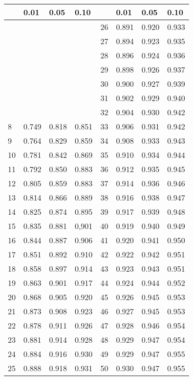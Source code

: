 \newpage \renewcommand\thetable{\arabic{table}}
    \label{tab7}
    \begin{tabularx}{\linewidth}{YYYY||YYYY}
      \toprule
       & 0.01 & 0.05 & 0.10 &
      & 0.01 & 0.05 & 0.10 \\
      \midrule
        & & & & 26 & 0.891 & 0.920 & 0.933 \\
        & & & & 27 & 0.894 & 0.923 & 0.935 \\
        & & & & 28 & 0.896 & 0.924 & 0.936 \\
        & & & & 29 & 0.898 & 0.926 & 0.937 \\
        & & & & 30 & 0.900 & 0.927 & 0.939 \\
        & & & & 31 & 0.902 & 0.929 & 0.940 \\
        & & & & 32 & 0.904 & 0.930 & 0.942 \\
      8 & 0.749 & 0.818 & 0.851 & 33 & 0.906 & 0.931 & 0.942 \\
      9 & 0.764 & 0.829 & 0.859 & 34 & 0.908 & 0.933 & 0.943 \\
      10 & 0.781 & 0.842 & 0.869 & 35 & 0.910 & 0.934 & 0.944 \\
      11 & 0.792 & 0.850 & 0.883 & 36 & 0.912 & 0.935 & 0.945 \\
      12 & 0.805 & 0.859 & 0.883 & 37 & 0.914 & 0.936 & 0.946 \\
      13 & 0.814 & 0.866 & 0.889 & 38 & 0.916 & 0.938 & 0.947 \\
      14 & 0.825 & 0.874 & 0.895 & 39 & 0.917 & 0.939 & 0.948 \\
      15 & 0.835 & 0.881 & 0,901 & 40 & 0.919 & 0.940 & 0.949 \\
      16 & 0.844 & 0.887 & 0.906 & 41 & 0.920 & 0.941 & 0.950 \\
      17 & 0.851 & 0.892 & 0.910 & 42 & 0.922 & 0.942 & 0.951 \\
      18 & 0.858 & 0.897 & 0.914 & 43 & 0.923 & 0.943 & 0.951 \\
      19 & 0.863 & 0.901 & 0.917 & 44 & 0.924 & 0.944 & 0.952 \\
      20 & 0.868 & 0.905 & 0.920 & 45 & 0.926 & 0.945 & 0.953 \\
      21 & 0.873 & 0.908 & 0.923 & 46 & 0.927 & 0.945 & 0.953 \\
      22 & 0.878 & 0.911 & 0.926 & 47 & 0.928 & 0.946 & 0.954 \\
      23 & 0.881 & 0.914 & 0.928 & 48 & 0.929 & 0.947 & 0.954 \\
      24 & 0.884 & 0.916 & 0.930 & 49 & 0.929 & 0.947 & 0.955 \\
      25 & 0.888 & 0.918 & 0.931 & 50 & 0.930 & 0.947 & 0.955 \\
      \bottomrule
    \end{tabularx}

